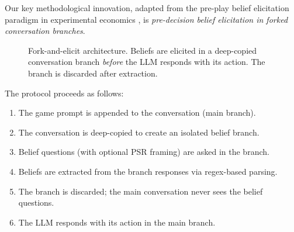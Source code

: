 \documentclass[12pt]{article}
\begin{document}
Our key methodological innovation, adapted from the pre-play belief elicitation paradigm in experimental economics \citep{nyarko2002experimental}, is \emph{pre-decision belief elicitation in forked conversation branches}.

\begin{figure}[h]
\centering
{}
\caption{Fork-and-elicit architecture. Beliefs are elicited in a deep-copied conversation branch \emph{before} the LLM responds with its action. The branch is discarded after extraction.}
\label{fig:fork}
\end{figure}

The protocol proceeds as follows:
\begin{enumerate}[nosep]
    \item The game prompt is appended to the conversation (main branch).
    \item The conversation is deep-copied to create an isolated belief branch.
    \item Belief questions (with optional PSR framing) are asked in the branch.
    \item Beliefs are extracted from the branch responses via regex-based parsing.
    \item The branch is discarded; the main conversation never sees the belief questions.
    \item The LLM responds with its action in the main branch.
\end{enumerate}
\end{document}
